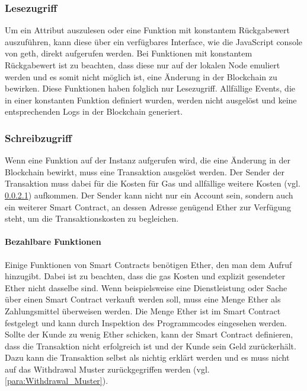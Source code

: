 \subsubsection{Lesezugriff}
\label{subsubsec:Lesezugriff}
Um ein Attribut auszulesen oder eine Funktion mit konstantem Rückgabewert auszuführen, kann diese über ein verfügbares Interface, wie die JavaScript console von geth, direkt aufgerufen werden. Bei Funktionen mit konstantem Rückgabewert ist zu beachten, dass diese nur auf der lokalen Node emuliert werden und es somit nicht möglich ist, eine Änderung in der Blockchain zu bewirken. Diese Funktionen haben folglich nur Lesezugriff. Allfällige Events, die in einer konstanten Funktion definiert wurden, werden nicht ausgelöst und keine entsprechenden Logs in der Blockchain generiert.\cite{media.consensys.net/events-and-logs}\cite[Wiki/Management APIs]{go-ethereum}

\subsubsection{Schreibzugriff}
\label{subsubsec:Schreibzugriff}
Wenn eine Funktion auf der Instanz aufgerufen wird, die eine Änderung in der Blockchain bewirkt, muss eine Transaktion ausgelöst werden. Der Sender der Transaktion muss dabei für die Kosten für Gas und allfällige weitere Kosten (vgl. \ref{re_para:Bezahlbare_Funktionen}) aufkommen. Der Sender kann nicht nur ein Account sein, sondern auch ein weiterer Smart Contract, an dessen Adresse genügend Ether zur Verfügung steht, um die Transaktionskosten zu begleichen.\cite[Solidity in Depth]{solidity.readthedocs.io}

\paragraph{Bezahlbare Funktionen}
\label{re_para:Bezahlbare_Funktionen}
Einige Funktionen von Smart Contracts benötigen Ether, den man dem Aufruf hinzugibt. Dabei ist zu beachten, dass die gas Kosten und explizit gesendeter Ether nicht dasselbe sind. Wenn beispielsweise eine Dienstleistung oder Sache über einen Smart Contract verkauft werden soll, muss eine Menge Ether als Zahlungsmittel überweisen werden. Die Menge Ether ist im Smart Contract festgelegt und kann durch Inspektion des Programmcodes eingesehen werden. Sollte der Kunde zu wenig Ether schicken, kann der Smart Contract definieren, dass die Transaktion nicht erfolgreich ist und der Kunde sein Geld zurückerhält. Dazu kann die Transaktion selbst als nichtig erklärt werden und es muss nicht auf das Withdrawal Muster zurückgegriffen werden (vgl. \ref{para:Withdrawal_Muster}).\cite[Solidity in Depth]{solidity.readthedocs.io}


